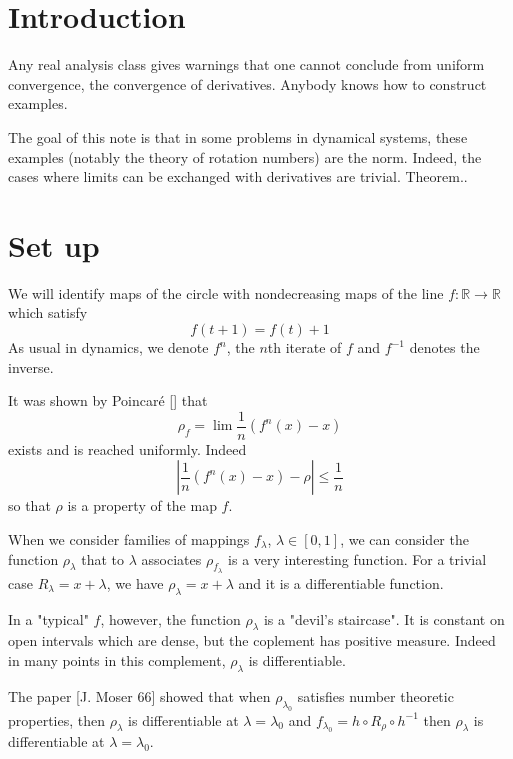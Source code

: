 \documentclass{article}
\title{}
\author{}
\date{}
\begin{document}
\maketitle

\section{Introduction}

Any real analysis class gives warnings that one cannot conclude from uniform convergence, the convergence of derivatives. Anybody knows how to construct examples.

The goal of this note is that in some problems in dynamical systems, these examples (notably the theory of rotation numbers) are the norm. Indeed, the cases where limits can be exchanged with derivatives are trivial. Theorem..

\section{Set up}

We will identify maps of the circle with nondecreasing maps of the line $f:\mathbb{R}\rightarrow\mathbb{R}$ which satisfy 
$$f(t+1)=f(t)+1$$
\label{index}
As usual in dynamics, we denote $f^n$, the $n$th iterate of $f$ and $f^{-1}$ denotes the inverse. 

It was shown by Poincar\'e [] that $$\rho_f=\lim\frac{1}{n}(f^n(x)-x)$$ exists and is reached uniformly. Indeed $$\left| \frac{1}{n}(f^n(x)-x)-\rho \right|\leq\frac{1}{n}$$
so that $\rho$ is a property of the map $f$.

When we consider families of mappings $f_\lambda$, $\lambda\in[0,1]$, we can consider the function $\rho_\lambda$ that to $\lambda$ associates $\rho_{f_\lambda}$ is a very interesting function. For a trivial case $R_\lambda=x+\lambda$, we have $\rho_\lambda=x+\lambda$ and it is a differentiable function. 

In a "typical" $f$, however, the function $\rho_\lambda$ is a "devil's staircase". It is constant on open intervals which are dense, but the coplement has positive measure. Indeed in many points in this complement, $\rho_\lambda$ is differentiable. 

The paper [J. Moser 66] showed that when $\rho_{\lambda_0}$ satisfies number theoretic properties, then $\rho_\lambda$ is differentiable at $\lambda=\lambda_0$ and $f_{\lambda_0}=h\circ R_\rho\circ h^{-1}$ then $\rho_\lambda$ is differentiable at $\lambda=\lambda_0$. 
\end{document}
